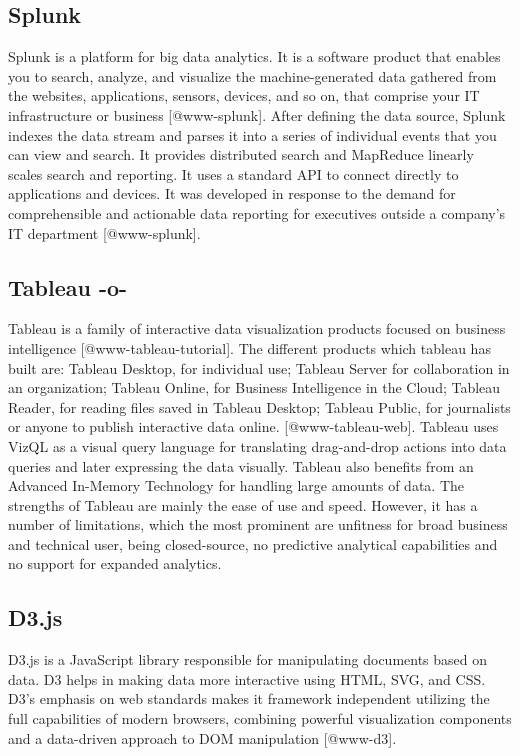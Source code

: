 \subsection{Splunk}

Splunk is a platform for big data analytics. It is a software product
that enables you to search, analyze, and visualize the
machine-generated data gathered from the websites, applications,
sensors, devices, and so on, that comprise your IT infrastructure or
business [@www-splunk]. After defining the data source, Splunk
indexes the data stream and parses it into a series of individual
events that you can view and search. It provides distributed search
and MapReduce linearly scales search and reporting. It uses a standard
API to connect directly to applications and devices. It was developed
in response to the demand for comprehensible and actionable data
reporting for executives outside a company's IT
department [@www-splunk].
    
\subsection{Tableau -o-}

Tableau is a family of interactive data visualization products focused
on business intelligence [@www-tableau-tutorial]. The different
products which tableau has built are: Tableau Desktop, for individual
use; Tableau Server for collaboration in an organization; Tableau
Online, for Business Intelligence in the Cloud; Tableau Reader, for
reading files saved in Tableau Desktop; Tableau Public, for
journalists or anyone to publish interactive data
online. [@www-tableau-web]. Tableau uses VizQL as a visual query
language for translating drag-and-drop actions into data queries and
later expressing the data visually. Tableau also benefits from an
Advanced In-Memory Technology for handling large amounts of data.  The
strengths of Tableau are mainly the ease of use and speed.  However,
it has a number of limitations, which the most prominent are unfitness
for broad business and technical user, being closed-source, no
predictive analytical capabilities and no support for expanded
analytics.



\subsection{D3.js}

D3.js is a JavaScript library responsible for manipulating documents
based on data. D3 helps in making data more interactive using HTML,
SVG, and CSS. D3's emphasis on web standards makes it framework
independent utilizing the full capabilities of modern browsers,
combining powerful visualization components and a data-driven approach
to DOM manipulation [@www-d3].

